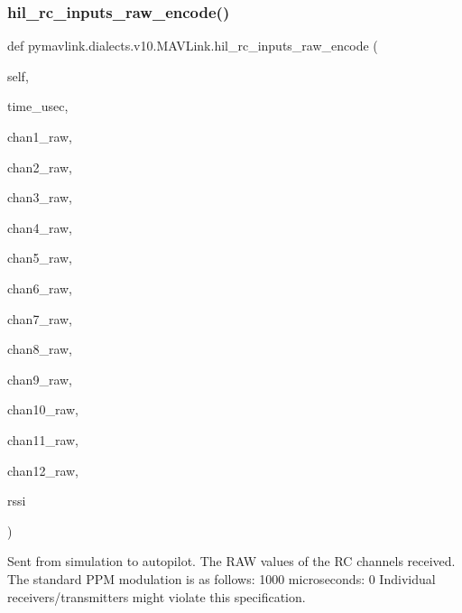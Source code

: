 \begin{DoxyVerb}
\begin{DoxyVerb}
\subsubsection{\texorpdfstring{hil\+\_\+rc\+\_\+inputs\+\_\+raw\+\_\+encode()}{hil\_rc\_inputs\_raw\_encode()}}
{\footnotesize\ttfamily def pymavlink.\+dialects.\+v10.\+M\+A\+V\+Link.\+hil\+\_\+rc\+\_\+inputs\+\_\+raw\+\_\+encode (\begin{DoxyParamCaption}\item[{}]{self,  }\item[{}]{time\+\_\+usec,  }\item[{}]{chan1\+\_\+raw,  }\item[{}]{chan2\+\_\+raw,  }\item[{}]{chan3\+\_\+raw,  }\item[{}]{chan4\+\_\+raw,  }\item[{}]{chan5\+\_\+raw,  }\item[{}]{chan6\+\_\+raw,  }\item[{}]{chan7\+\_\+raw,  }\item[{}]{chan8\+\_\+raw,  }\item[{}]{chan9\+\_\+raw,  }\item[{}]{chan10\+\_\+raw,  }\item[{}]{chan11\+\_\+raw,  }\item[{}]{chan12\+\_\+raw,  }\item[{}]{rssi }\end{DoxyParamCaption})}

\begin{DoxyVerb}Sent from simulation to autopilot. The RAW values of the RC channels
received. The standard PPM modulation is as follows:
1000 microseconds: 0%
Individual receivers/transmitters might violate this
specification.


\end{DoxyVerb}
\end{DoxyVerb}
\end{DoxyVerb}
